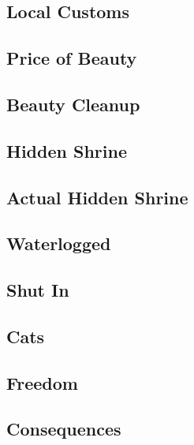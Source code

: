 

\subsection{Local Customs}


\subsection{Price of Beauty}


\subsection{Beauty Cleanup}


\subsection{Hidden Shrine}


\subsection{Actual Hidden Shrine}


\subsection{Waterlogged}


\subsection{Shut In}


\subsection{Cats}


\subsection{Freedom}


\subsection{Consequences}

